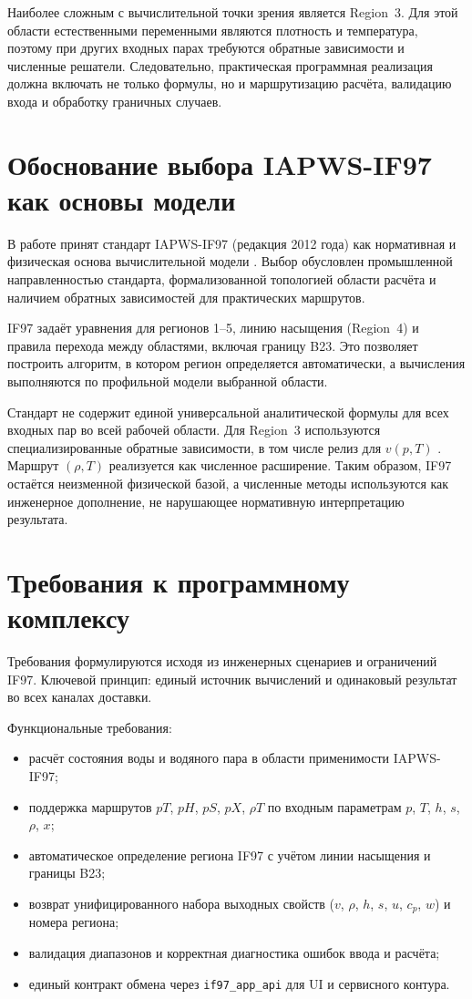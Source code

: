Наиболее сложным с вычислительной точки зрения является Region~3.
Для этой области естественными переменными являются плотность и температура,
поэтому при других входных парах требуются обратные зависимости и численные решатели.
Следовательно, практическая программная реализация должна включать не только формулы,
но и маршрутизацию расчёта, валидацию входа и обработку граничных случаев.

\section{Обоснование выбора IAPWS-IF97 как основы модели}

В работе принят стандарт IAPWS-IF97 (редакция 2012 года) как нормативная
и физическая основа вычислительной модели \cite{iapws_if97_2012}.
Выбор обусловлен промышленной направленностью стандарта, формализованной
топологией области расчёта и наличием обратных зависимостей для практических маршрутов.

IF97 задаёт уравнения для регионов 1--5, линию насыщения (Region~4)
и правила перехода между областями, включая границу B23.
Это позволяет построить алгоритм, в котором регион определяется автоматически,
а вычисления выполняются по профильной модели выбранной области.

Стандарт не содержит единой универсальной аналитической формулы для всех входных пар
во всей рабочей области.
Для Region~3 используются специализированные обратные зависимости,
в том числе релиз для $v(p,T)$ \cite{iapws_vpt_region3}.
Маршрут $(\rho, T)$ реализуется как численное расширение.
Таким образом, IF97 остаётся неизменной физической базой,
а численные методы используются как инженерное дополнение,
не нарушающее нормативную интерпретацию результата.

\section{Требования к программному комплексу}

Требования формулируются исходя из инженерных сценариев и ограничений IF97.
Ключевой принцип: единый источник вычислений и одинаковый результат
во всех каналах доставки.

Функциональные требования:
\begin{itemize}
\item расчёт состояния воды и водяного пара в области применимости IAPWS-IF97;
\item поддержка маршрутов $pT$, $pH$, $pS$, $pX$, $\rho T$ по входным параметрам $p$, $T$, $h$, $s$, $\rho$, $x$;
\item автоматическое определение региона IF97 с учётом линии насыщения и границы B23;
\item возврат унифицированного набора выходных свойств ($v$, $\rho$, $h$, $s$, $u$, $c_p$, $w$) и номера региона;
\item валидация диапазонов и корректная диагностика ошибок ввода и расчёта;
\item единый контракт обмена через \texttt{if97\_app\_api} для UI и сервисного контура.
\end{itemize}

